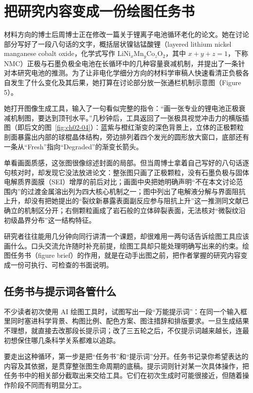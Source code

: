 \chapter{把研究内容变成一份绘图任务书}

材料方向的博士后周博士正在修改一篇关于锂离子电池循环老化的论文。她在讨论部分写好了一段八句话的文字，概括层状镍钴锰酸锂（layered lithium nickel manganese cobalt oxide，化学式写作 LiNi$_x$Mn$_y$Co$_z$O$_2$，其中 $x+y+z=1$，下称 NMC）正极与石墨负极全电池在长循环中的几种容量衰减机制，并提出了一条针对本研究电池的推测。为了让非电化学细分方向的材料学审稿人快速看清正负极各自发生了什么变化及其后果，她打算在讨论部分放一张通栏机制示意图（Figure 5）。

她打开图像生成工具，输入了一句看似完整的指令：“画一张专业的锂电池正极衰减机制图，要达到顶刊水平。”几秒钟后，工具返回了一张极具视觉冲击力的横版插图（即后文的图~\ref{fig:ch02-04}）：蓝紫与橙红渐变的深色背景上，立体的正极颗粒剖面暴露出内部的球棍晶体结构，旁边排列着四个发光的圆形放大窗口，底部还有一条从“Fresh”指向“Degraded”的渐变长箭头。

单看画面质感，这张图很像综述封面的局部。但当周博士拿着自己写好的八句话逐句核对时，却发现它没法放进论文：整张图只画了正极颗粒，没有石墨负极与固体电解质界面膜（SEI）增厚的前后对比；画面中央把她明确声明“不在本文讨论范围内”的过渡金属溶出列为四大核心机制之一；图中列出了电解液分解与界面阻抗上升，却没有把她提出的“裂纹新暴露表面副反应参与阻抗上升”这一推测同文献已确立的机制区分开；右侧颗粒画成了岩石般的立体碎裂表面，无法核对“微裂纹沿初级晶界分布”这一结构特征。

研究者往往能用几分钟向同行讲清一个课题，却很难用一两句话告诉绘图工具应该画什么。口头交流允许随时补充前提，绘图工具却只能处理明确写出来的约束。绘图任务书（figure brief）的作用，就是在动手出图之前，把作者掌握的研究内容变成一份可执行、可检查的书面说明。

\section{任务书与提示词各管什么}

不少读者初次使用 AI 绘图工具时，试图写出一段“万能提示词”：在同一个输入框里同时塞进科学背景、构图比例、配色方案、图注措辞和排版要求。一旦生成结果不理想，就直接去改那段长提示词；改了三五轮之后，不仅提示词越来越长，连最初想保住哪几条科学关系都难以追踪。

要走出这种循环，第一步是把“任务书”和“提示词”分开。任务书记录你希望表达的内容及其依据，是贯穿整张图生命周期的底稿。提示词则针对某一次具体操作，把任务书中的相关部分截取出来交给工具。它们在初次生成时可能很接近，但随着操作阶段不同而有明显分工。

